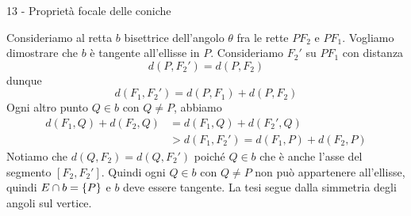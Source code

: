 \documentclass[a4paper]{article}
\begin{document}
\begin{snippetsolution}{13 - Proprietà focale delle coniche}

    \begin{figure}
        \begin{center}
        \end{center}
    \end{figure}
    Consideriamo al retta \(b\) bisettrice dell'angolo \(\theta\) fra le rette
    \(PF_2\) e \(PF_1\). Vogliamo dimostrare che \(b\) è tangente all'ellisse in \(P\).
    Consideriamo \(F_2'\) su \(PF_1\) con distanza
    \[
        d(P, F_2') = d(P, F_2)
    \]
    dunque
    \[
        d(F_1, F_2') = d(P, F_1) + d(P, F_2)
    \]
    Ogni altro punto \(Q \in b\) con \(Q \neq P\),
    abbiamo \begin{align*}
        d(F_1, Q) + d(F_2, Q)
        &= d(F_1, Q) + d(F_2', Q) \\
        &> d(F_1, F_2') = d(F_1, P) + d(F_2, P)
    \end{align*}
    Notiamo che \(d(Q, F_2) = d(Q, F_2')\) poiché
    \(Q \in b\) che è anche l'asse del segmento \([F_2, F_2']\).
    Quindi ogni \(Q \in b\) con \(Q \neq P\) non può appartenere all'ellisse,
    quindi \(E \cap b = \{P\}\) e \(b\) deve essere tangente. La tesi segue dalla simmetria
    degli angoli sul vertice.
    \wrapfill
\end{snippetsolution}
\end{document}

